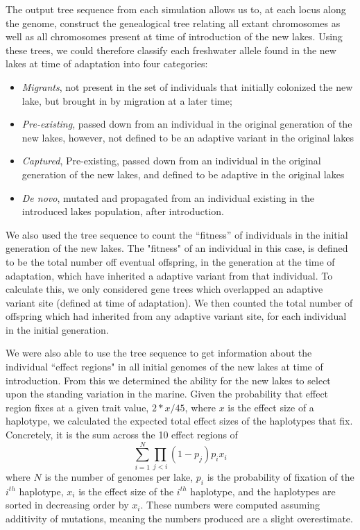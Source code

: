 \documentclass{article}
\begin{document}
The output tree sequence from each simulation allows us to,
at each locus along the genome,
construct the genealogical tree relating all extant chromosomes
as well as all chromosomes present at time of introduction of the new lakes.
Using these trees,
we could therefore classify each freshwater allele found in the new lakes at time of adaptation
into four categories:
\begin{itemize}
    \item \emph{Migrants}, not present in the set of individuals that initially colonized
        the new lake, but brought in by migration at a later time;
    \item \emph{Pre-existing}, passed down from an individual in the original generation of the new lakes, 
however, not defined to be an adaptive variant in the original lakes
    \item \emph{Captured}, Pre-existing, passed down from an individual in the original generation of the new lakes, 
and defined to be adaptive in the original lakes
    \item \emph{De novo}, mutated and propagated from an individual existing in the introduced lakes population, after introduction. 
\end{itemize}

We also used the tree sequence to count the ``fitness'' of individuals in the initial generation of the new lakes. 
The "fitness" of an individual in this case, is defined to be the total number off eventual offspring, in the generation at the time of adaptation, 
which have inherited a adaptive variant from that individual. 
To calculate this, we only considered gene trees which overlapped an adaptive variant site (defined at time of adaptation).
We then counted the total number of offspring which had inherited from any adaptive variant site, 
for each individual in the initial generation. 

We were also able to use the tree sequence to get information about the individual ``effect regions" 
in all initial genomes of the new lakes at time of introduction.
From this we determined the ability for the new lakes to select upon the standing variation in the marine.
Given the probability that effect region fixes at a given trait value, $2 * x / 45$, where $x$ is the effect size of a haplotype,
we calculated the expected total effect sizes of the haplotypes that fix.
Concretely, it is the sum across the 10 effect regions of
$$\sum_{i=1}^N \prod_{j < i} (1 - p_j) p_i x_i$$
where $N$ is the number of genomes per lake, $p_i$ is the probability of fixation of the 
$i^{th}$ haplotype, $x_{i}$ is the effect size of the $i^{th}$ haplotype, and the haplotypes are sorted in decreasing order by $x_{i}$.
These numbers were computed assuming additivity of mutations, meaning the numbers produced are a slight overestimate.
\end{document}
